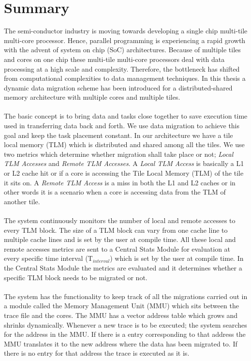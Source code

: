 \documentclass{listhesis}
\begin{document}
\section{Summary}
The semi-conductor industry is moving towards developing a single chip multi-tile multi-core processor. Hence, parallel programming is experiencing a rapid growth with the advent of system on chip (SoC) architectures. Because of multiple tiles and cores on one chip these multi-tile multi-core processors deal with data processing at a high scale and complexity. Therefore, the bottleneck has shifted from computational complexities to data management techniques. In this thesis a dynamic data migration scheme has been introduced for a distributed-shared memory architecture with multiple cores and multiple tiles.\\
\\
The basic concept is to bring data and tasks close together to save execution time used in transferring data back and forth. We use data migration to achieve this goal and keep the task placement constant. In our architecture we have a tile local memory (TLM) which is distributed and shared among all the tiles. We use two metrics which determine whether migration shall take place or not; \textit{Local TLM Accesses} and \textit{Remote TLM Accesses}. A \textit{Local TLM Access} is basically a L1 or L2 cache hit or if a core is accessing the Tile Local Memory (TLM) of the tile it sits on. A \textit{Remote TLM Access} is a miss in both the L1 and L2 caches or in other words it is a scenario when a core is accessing data from the TLM of another tile. \\
\\
The system continuously monitors the number of local and remote accesses to every TLM block. The size of a TLM block can vary from one cache line to multiple cache lines and is set by the user at compile time. All these local and remote accesses metrics are sent to a Central Stats Module for evaluation at every specific time interval (T$_{interval}$) which is set by the user at compile time. In the Central Stats Module the metrics are evaluated and it determines whether a specific TLM block needs to be migrated or not.\\
\\
The system has the functionality to keep track of all the migrations carried out in a module called the Memory Management Unit (MMU) which sits between the trace file and the cores. The MMU has a vector address table which grows and shrinks dynamically. Whenever a new trace is to be executed; the system searches for the address in the MMU. If there is a entry corresponding to that address the MMU translates it to the new address where the data has been migrated to. If there is no entry for that address the trace is executed as it is. \\
\end{document}
